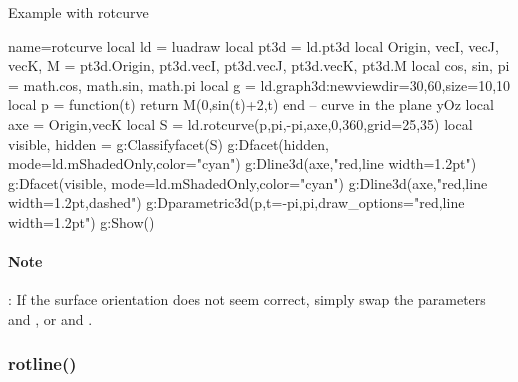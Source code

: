 \begin{demo}{Example with rotcurve}
\begin{luadraw}{name=rotcurve}
local ld = luadraw
local pt3d = ld.pt3d
local Origin, vecI, vecJ, vecK, M = pt3d.Origin, pt3d.vecI, pt3d.vecJ, pt3d.vecK, pt3d.M
local cos, sin, pi = math.cos, math.sin, math.pi
local g = ld.graph3d:new{viewdir={30,60},size={10,10}}
local p = function(t) return M(0,sin(t)+2,t) end -- curve in the plane yOz
local axe = {Origin,vecK}
local S = ld.rotcurve(p,pi,-pi,axe,0,360,{grid={25,35}})
local visible, hidden = g:Classifyfacet(S)
g:Dfacet(hidden, {mode=ld.mShadedOnly,color="cyan"})
g:Dline3d(axe,"red,line width=1.2pt")
g:Dfacet(visible, {mode=ld.mShadedOnly,color="cyan"})
g:Dline3d(axe,"red,line width=1.2pt,dashed")
g:Dparametric3d(p,{t={-pi,pi},draw_options="red,line width=1.2pt"})
g:Show()
\end{luadraw}
\end{demo}

\paragraph{Note}: If the surface orientation does not seem correct, simply swap the parameters  and , or  and .

\subsubsection{rotline()}


